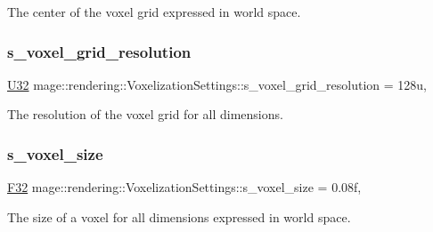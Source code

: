 The center of the voxel grid expressed in world space. \hypertarget{classmage_1_1rendering_1_1_voxelization_settings_aa709675f6700320077718e1954854ca6}{}\label{classmage_1_1rendering_1_1_voxelization_settings_aa709675f6700320077718e1954854ca6} 
\subsubsection{\texorpdfstring{s\+\_\+voxel\+\_\+grid\+\_\+resolution}{s\_voxel\_grid\_resolution}}
{\footnotesize\ttfamily \hyperlink{namespacemage_a41c104c036fba3756a74e19f793eeaa1}{U32} mage\+::rendering\+::\+Voxelization\+Settings\+::s\+\_\+voxel\+\_\+grid\+\_\+resolution = 128u\hspace{0.3cm}{\ttfamily [static]}, {\ttfamily [private]}}

The resolution of the voxel grid for all dimensions. \hypertarget{classmage_1_1rendering_1_1_voxelization_settings_a647150f56ef8546b6e18f5ad8dd2e661}{}\label{classmage_1_1rendering_1_1_voxelization_settings_a647150f56ef8546b6e18f5ad8dd2e661} 
\subsubsection{\texorpdfstring{s\+\_\+voxel\+\_\+size}{s\_voxel\_size}}
{\footnotesize\ttfamily \hyperlink{namespacemage_aa97e833b45f06d60a0a9c4fc22ae02c0}{F32} mage\+::rendering\+::\+Voxelization\+Settings\+::s\+\_\+voxel\+\_\+size = 0.\+08f\hspace{0.3cm}{\ttfamily [static]}, {\ttfamily [private]}}

The size of a voxel for all dimensions expressed in world space. 